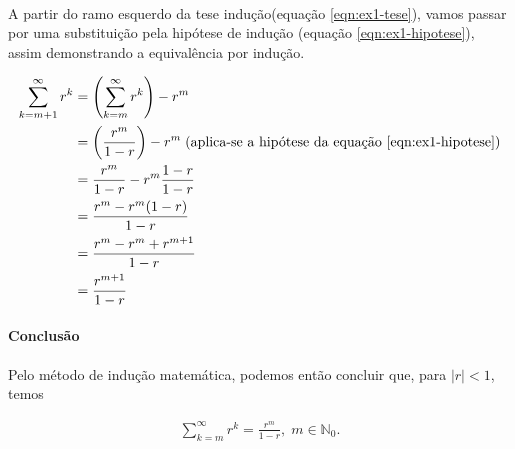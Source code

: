 \paragraph{} A partir do ramo esquerdo da tese indução(equação \ref{eqn:ex1-tese}),
vamos passar por uma substituição pela hipótese de indução
(equação \ref{eqn:ex1-hipotese}), assim demonstrando a equivalência por indução.

\begin{align*}
	\sum^{\infty}_{k=m+1} r^k &= \left(\sum^{\infty}_{k=m} r^k\right) - r^m \\
	&= \left(\frac{r^m}{1 - r}\right) - r^m \;
	 \text{(aplica-se a hipótese da equação \ref{eqn:ex1-hipotese})}\\
	&= \frac{r^m}{1 - r} - r^m \frac{1 - r}{1 - r}\\
	&= \frac{r^m - r^m(1 - r)}{1 - r} \\
	&= \frac{r^m - r^m + r^{m+1}}{1 - r} \\
	&= \frac{r^{m+1}}{1 - r}\\
\end{align*}


\paragraph{Conclusão} Pelo método de indução matemática, podemos então
concluir que, para $|r| < 1$, temos

\begin{align*}
	\sum^{\infty}_{k=m} r^k = \frac{r^m}{1 - r}, \; m \in \mathbb{N}_{0}.
\end{align*}

